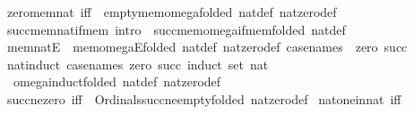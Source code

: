 \begin{isabellebody}
\ \ \ zero{\isacharunderscore}{\kern0pt}mem{\isacharunderscore}{\kern0pt}nat\ {\isacharbrackleft}{\kern0pt}iff{\isacharbrackright}{\kern0pt}\ {\isacharequal}{\kern0pt}\ empty{\isacharunderscore}{\kern0pt}mem{\isacharunderscore}{\kern0pt}omega{\isacharbrackleft}{\kern0pt}folded\ nat{\isacharunderscore}{\kern0pt}def\ nat{\isacharunderscore}{\kern0pt}zero{\isacharunderscore}{\kern0pt}def{\isacharbrackright}{\kern0pt}\isanewline
\ \ \ succ{\isacharunderscore}{\kern0pt}mem{\isacharunderscore}{\kern0pt}nat{\isacharunderscore}{\kern0pt}if{\isacharunderscore}{\kern0pt}mem\ {\isacharbrackleft}{\kern0pt}intro{\isacharbang}{\kern0pt}{\isacharbrackright}{\kern0pt}\ {\isacharequal}{\kern0pt}\ succ{\isacharunderscore}{\kern0pt}mem{\isacharunderscore}{\kern0pt}omega{\isacharunderscore}{\kern0pt}if{\isacharunderscore}{\kern0pt}mem{\isacharbrackleft}{\kern0pt}folded\ nat{\isacharunderscore}{\kern0pt}def{\isacharbrackright}{\kern0pt}\isanewline
\ \ \ mem{\isacharunderscore}{\kern0pt}natE\ {\isacharequal}{\kern0pt}\ mem{\isacharunderscore}{\kern0pt}omegaE{\isacharbrackleft}{\kern0pt}folded\ nat{\isacharunderscore}{\kern0pt}def\ nat{\isacharunderscore}{\kern0pt}zero{\isacharunderscore}{\kern0pt}def{\isacharcomma}{\kern0pt}\ case{\isacharunderscore}{\kern0pt}names\ {\isacharunderscore}{\kern0pt}\ zero\ succ{\isacharbrackright}{\kern0pt}\isanewline
\ \ \ nat{\isacharunderscore}{\kern0pt}induct\ {\isacharbrackleft}{\kern0pt}case{\isacharunderscore}{\kern0pt}names\ zero\ succ{\isacharcomma}{\kern0pt}\ induct\ set{\isacharcolon}{\kern0pt}\ nat{\isacharbrackright}{\kern0pt}\ {\isacharequal}{\kern0pt}\isanewline
\ \ \ \ omega{\isacharunderscore}{\kern0pt}induct{\isacharbrackleft}{\kern0pt}folded\ nat{\isacharunderscore}{\kern0pt}def\ nat{\isacharunderscore}{\kern0pt}zero{\isacharunderscore}{\kern0pt}def{\isacharbrackright}{\kern0pt}\isanewline
\ \ \ succ{\isacharunderscore}{\kern0pt}ne{\isacharunderscore}{\kern0pt}zero\ {\isacharbrackleft}{\kern0pt}iff{\isacharbrackright}{\kern0pt}\ {\isacharequal}{\kern0pt}\ Ordinals{\isachardot}{\kern0pt}succ{\isacharunderscore}{\kern0pt}ne{\isacharunderscore}{\kern0pt}empty{\isacharbrackleft}{\kern0pt}folded\ nat{\isacharunderscore}{\kern0pt}zero{\isacharunderscore}{\kern0pt}def{\isacharbrackright}{\kern0pt}\isanewline
\isanewline
{}\isamarkupfalse%
\ nat{\isacharunderscore}{\kern0pt}one{\isacharunderscore}{\kern0pt}in{\isacharunderscore}{\kern0pt}nat\ {\isacharbrackleft}{\kern0pt}iff{\isacharbrackright}{\kern0pt}{\isacharcolon}{\kern0pt}\ {\isachardoublequoteopen}{}\ {\isasymin}\ {\isasymnat}{\isachardoublequoteclose}\isanewline

\end{isabellebody}
